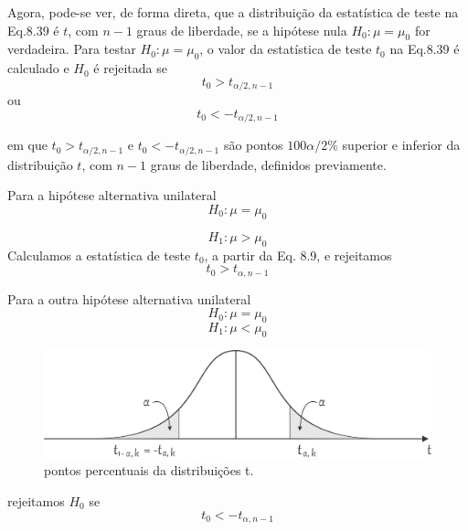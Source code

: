 \documentclass[a4paper,12pt]{article} %
\begin{document}
	Agora, pode-se ver, de forma direta, que a distribuição da estatística de teste na Eq.8.39 é $t$, com $n-1$ graus de liberdade, se a hipótese nula $H_0: \mu = \mu_0$ for verdadeira. Para testar $H_0: \mu = \mu_0$, o valor da estatística de teste $t_0$ na Eq.8.39 é calculado e $H_0$ é rejeitada se
	\begin{equation}
		\tag{8.41a}
		t_0 > t_{\alpha / 2, n-1}
	\end{equation}
	ou
	\begin{equation}
		\tag{8.41b}
		t_0 < - t_{\alpha / 2, n-1}
	\end{equation}

	em que $t_0 > t_{\alpha / 2, n-1}$ e $t_0 < - t_{\alpha / 2, n-1}$ são pontos $100 \alpha / 2 \%$ superior e inferior da distribuição $t$, com $n-1$ graus de liberdade, definidos previamente.
	
	\hspace*{12pt} Para a hipótese alternativa unilateral
	\begin{equation*}
		H_0: \mu = \mu_0
	\end{equation*}
	
	\begin{equation}
		\tag{8.42}
		H_1: \mu > \mu_0
	\end{equation}
	Calculamos a estatística de teste $t_0$, a partir da Eq. 8.9, e rejeitamos %
	\begin{equation}
		\tag{8.43}
		t_0 >  t_{\alpha, n-1}
	\end{equation}

	Para a outra hipótese alternativa unilateral
	\begin{equation*}
		H_0: \mu = \mu_0
	\end{equation*}
	\begin{equation}
		\tag{8.44}
		H_1: \mu < \mu_0
	\end{equation}

	\begin{figure}[H]
		\centering
		\includegraphics[width=0.7\linewidth]{fig2}
		\caption[]{pontos percentuais da distribuições t.}
	
	\end{figure}

	rejeitamos $H_0$ se
	\begin{equation}
		\tag{8.45}
		t_0 < -t_{\alpha, n-1}
	\end{equation}
\end{document}
